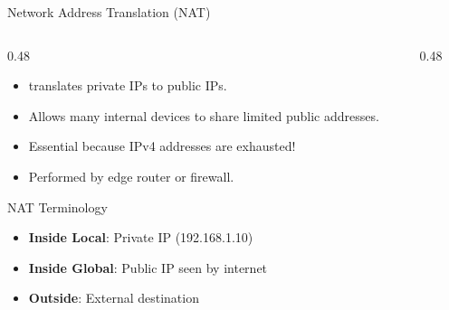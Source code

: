 \documentclass[aspectratio=169]{beamer}  %
\begin{document}
\begin{frame}{Network Address Translation (NAT)}
    \begin{columns}[T]
        \begin{column}{0.48\textwidth}
            \begin{itemize}
                \item {} translates private IPs to public IPs.
                \item Allows many internal devices to share limited public addresses.
                \item Essential because IPv4 addresses are exhausted!
                \item Performed by edge router or firewall.
            \end{itemize}
            
            \vspace{0.2em}
            \begin{block}{NAT Terminology}
                \small
                \begin{itemize}\setlength{\itemsep}{1pt}
                    \item \textbf{Inside Local}: Private IP (192.168.1.10)
                    \item \textbf{Inside Global}: Public IP seen by internet
                    \item \textbf{Outside}: External destination
                \end{itemize}
            \end{block}
        \end{column}
        \begin{column}{0.48\textwidth}
            \begin{center}
\end{center}
\end{column}
\end{columns}
\end{frame}
\end{document}
